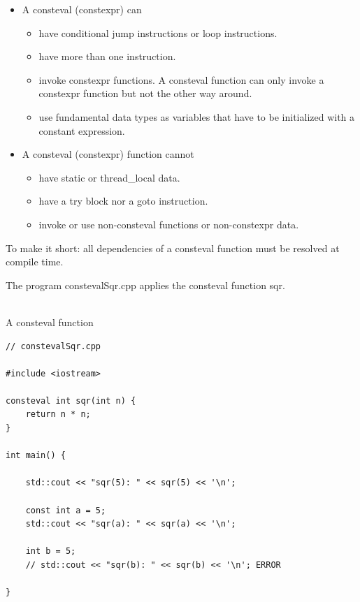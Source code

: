 \begin{itemize}
\item 
A consteval (constexpr) can
\begin{itemize}
\item 
have conditional jump instructions or loop instructions.

\item 
have more than one instruction.

\item 
invoke constexpr functions. A consteval function can only invoke a constexpr function but not the other way around.

\item 
use fundamental data types as variables that have to be initialized with a constant expression.
\end{itemize}

\item 
A consteval (constexpr) function cannot
\begin{itemize}
\item 
have static or thread\_local data.

\item 
have a try block nor a goto instruction.

\item 
invoke or use non-consteval functions or non-constexpr data.
\end{itemize}
\end{itemize}

To make it short: all dependencies of a consteval function must be resolved at compile time.

The program constevalSqr.cpp applies the consteval function sqr.

\hspace*{\fill} \\ %
\noindent
A consteval function
\begin{lstlisting}[style=styleCXX]
// constevalSqr.cpp

#include <iostream>

consteval int sqr(int n) {
	return n * n;
}

int main() {

	std::cout << "sqr(5): " << sqr(5) << '\n';
	
	const int a = 5;
	std::cout << "sqr(a): " << sqr(a) << '\n';
	
	int b = 5;
	// std::cout << "sqr(b): " << sqr(b) << '\n'; ERROR

}
\end{lstlisting}

